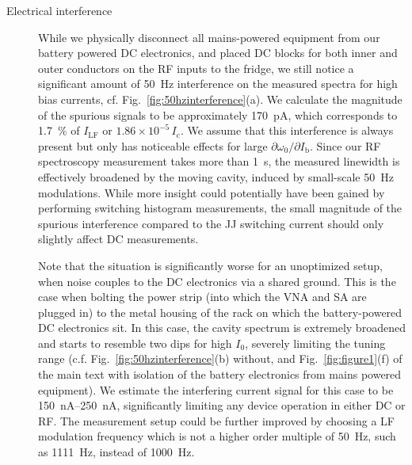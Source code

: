 \begin{description}
	\item[Electrical interference] While we physically disconnect all mains-powered equipment from our battery powered DC electronics, and placed DC blocks for both inner and outer conductors on the RF inputs to the fridge, we still notice a significant amount of \SI{50}{\hertz} interference on the measured spectra for high bias currents, cf. Fig.~\ref{fig:50hzinterference}(a).
	We calculate the magnitude of the spurious signals to be approximately \SI{170}{\pico\ampere}, which corresponds to \SI{1.7}{\percent} of $I_\text{LF}$ or $1.86\times 10^{-5}\, I_\text{c}$.
	We assume that this interference is always present but only has noticeable effects for large $\partial\omega_0/\partial I_\text{b}$.
	Since our RF spectroscopy measurement takes more than \SI{1}{\second}, the measured linewidth is effectively broadened by the moving cavity, induced by small-scale \SI{50}{\hertz} modulations.
	While more insight could potentially have been gained by performing switching histogram measurements, the small magnitude of the spurious interference compared to the JJ switching current should only slightly affect DC measurements.
	
	Note that the situation is significantly worse for an unoptimized setup, when noise couples to the DC electronics via a shared ground.
	This is the case when bolting the power strip (into which the VNA and SA are plugged in) to the metal housing of the rack on which the battery-powered DC electronics sit.
	In this case, the cavity spectrum is extremely broadened and starts to resemble two dips for high $I_0$, severely limiting the tuning range (c.f. Fig.~\ref{fig:50hzinterference}(b) without, and Fig.~\ref{fig:figure1}(f) of the main text with isolation of the battery electronics from mains powered equipment).
	We estimate the interfering current signal for this case to be \SIrange{150}{250}{\nano\ampere}, significantly limiting any device operation in either DC or RF.
	The measurement setup could be further improved by choosing a LF modulation frequency which is not a higher order multiple of \SI{50}{\hertz}, such as \SI{1111}{\hertz}, instead of \SI{1000}{\hertz}.
	

\end{description}
